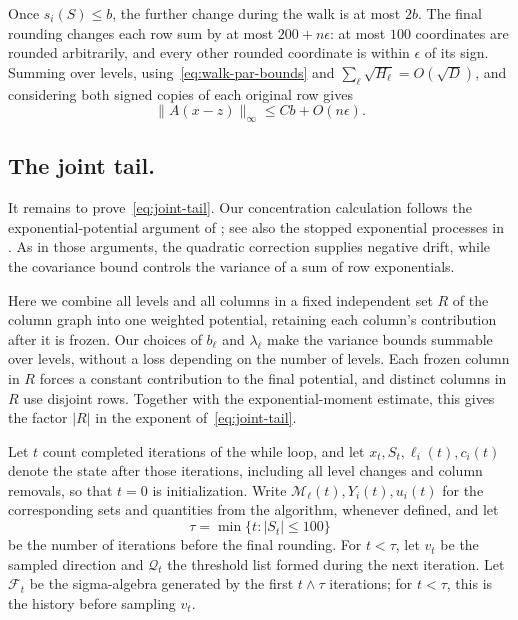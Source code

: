 \documentclass[reqno]{amsart}
\theoremstyle{definition}
\begin{document}
Once $s_i(S)\le b$, the further change during the walk is at most $2b$. The final rounding changes each row sum by at most $200+n\epsilon$: at most $100$ coordinates are rounded arbitrarily, and every other rounded coordinate is within $\epsilon$ of its sign. Summing over levels, using~\eqref{eq:walk-par-bounds} and $\sum_\ell\sqrt{H_\ell}=O(\sqrt D)$, and considering both signed copies of each original row gives
\begin{equation}\label{eq:walk-error} \|A(x-z)\|_\infty\le Cb+O(n\epsilon). \end{equation}

\subsection{The joint tail.}\label{sec:joint tail}

It remains to prove~\eqref{eq:joint-tail}. Our concentration calculation follows the exponential-potential argument of \cite[Sections~3.2.5 and~5.2]{BJ}; see also the stopped exponential processes in \cite[Theorem~2.6]{BJexp}. As in those arguments, the quadratic correction supplies negative drift, while the covariance bound controls the variance of a sum of row exponentials.

Here we combine all levels and all columns in a fixed independent set $R$ of the column graph into one weighted potential, retaining each column's contribution after it is frozen. Our choices of $b_\ell$ and $\lambda_\ell$ make the variance bounds summable over levels, without a loss depending on the number of levels. Each frozen column in $R$ forces a constant contribution to the final potential, and distinct columns in $R$ use disjoint rows. Together with the exponential-moment estimate, this gives the factor $|R|$ in the exponent of~\eqref{eq:joint-tail}.

Let $t$ count completed iterations of the while loop, and let $x_t,S_t,\ell_i(t),c_i(t)$ denote the state after those iterations, including all level changes and column removals, so that $t=0$ is initialization. Write $\mathcal M_\ell(t),Y_i(t),u_i(t)$ for the corresponding sets and quantities from the algorithm, whenever defined, and let
\[ \tau=\min\{t:|S_t|\le100\} \]
be the number of iterations before the final rounding. For $t<\tau$, let $v_t$ be the sampled direction and $\mathcal Q_t$ the threshold list formed during the next iteration. Let $\mathcal F_t$ be the sigma-algebra generated by the first $t\wedge\tau$ iterations; for $t<\tau$, this is the history before sampling $v_t$.
\end{document}
